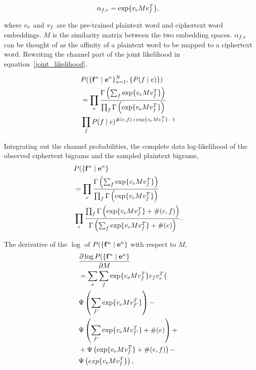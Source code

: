 \begin{equation}
\alpha_{f,e} = \exp \{ v_{e}  M  v_{f}^T \},
\end{equation}

where $v_{e}$ and $v_{f}$ are the pre-trained plaintext word and ciphertext word embeddings.  $M$ is the similarity matrix between the two embedding spaces. $\alpha_{f,e}$ can be thought of as the affinity of a plaintext word to be mapped to a ciphertext word. Rewriting the channel part of the joint likelihood in equation~\ref{joint_likelihood}, 

\begin{align*}
&P( \{ \mathbf{f}^n \mid \mathbf{e}^n \}_{n=1}^{N}, \{ P(f \mid e) \})  \\
&=\prod_{e}  \frac{\Gamma \left( \sum_{f} \exp \{ v_{e}  M  v_{f}^T \}  \right)} {\prod_{f} \Gamma \left( \exp \{ v_{e}  M  v_{f}^T \} \right)} \\
& \prod_{f} P(f \mid e)^{\#(e,f)+ \exp \{ v_{e}  M  v_{f}^T \} -1} 
\end{align*}

Integrating out the channel probabilities, the complete data log-likelihood of the observed ciphertext bigrams and the sampled plaintext bigrams,
\begin{align}
&P( \{ \mathbf{f}^n \mid \mathbf{e}^n \} \\
&= \prod_{e}  \frac{\Gamma \left( \sum_{f} \exp \{ v_{e}  M  v_{f}^T \}  \right)} {\prod_{f} \Gamma \left( \exp \{ v_{e}  M  v_{f}^T \} \right)} \\
& \prod_{e}  \frac{\prod_{f} \Gamma \left( \exp \{ v_{e}  M  v_{f}^T \} + \#(e,f) \right)} {\Gamma \left( \sum_{f} \exp \{ v_{e}  M  v_{f}^T \} + \#(e) \right)}.
\end{align}

The derivative of the $\log$ of $P( \{ \mathbf{f}^n \mid \mathbf{e}^n \}$ with respect to $M$, 
\begin{align}
&\frac {\partial \log P( \{ \mathbf{f}^n \mid \mathbf{e}^n \}}{\partial M}  \\
& = \sum_{e}  \sum_{f} \exp \{ v_{e}  M  v_{f}^T \}  v_{f} v_{e}^T \bigl( \\
& \Psi \left( \sum_{f'} \exp \{ v_{e}  M  v_{f'}^T \} \right) - \\
& \Psi \left( \sum_{f'} \exp \{ v_{e}  M  v_{f'}^T \} + \#(e) \right)  + \\
& + \Psi \left( \exp \{ v_{e}  M  v_{f}^T \} + \#(e,f) \right) - \\
& \Psi \left( exp \{ v_{e}  M  v_{f}^T \} \right), 
\end{align}

